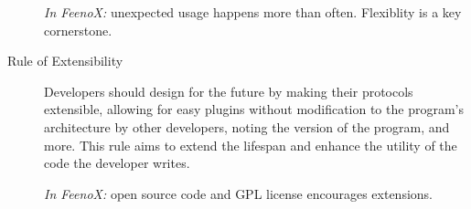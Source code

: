 \documentclass[
  american,
]{article}
\begin{document}
\begin{description}
\emph{In FeenoX:} unexpected usage happens more than often. Flexiblity
is a key cornerstone.
\item[Rule of Extensibility]
Developers should design for the future by making their protocols
extensible, allowing for easy plugins without modification to the
program's architecture by other developers, noting the version of the
program, and more. This rule aims to extend the lifespan and enhance the
utility of the code the developer writes.

\emph{In FeenoX:} open source code and GPL license encourages
extensions.
\end{description}
\end{document}
